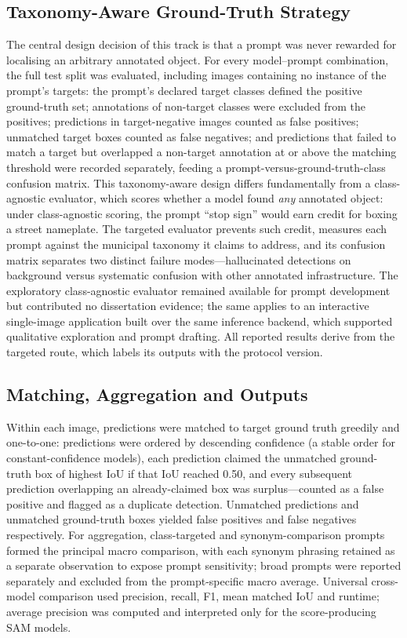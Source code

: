 \subsection{Taxonomy-Aware Ground-Truth Strategy}

The central design decision of this track is that a prompt was never rewarded for localising an arbitrary annotated object. For every model--prompt combination, the full test split was evaluated, including images containing no instance of the prompt's targets: the prompt's declared target classes defined the positive ground-truth set; annotations of non-target classes were excluded from the positives; predictions in target-negative images counted as false positives; unmatched target boxes counted as false negatives; and predictions that failed to match a target but overlapped a non-target annotation at or above the matching threshold were recorded separately, feeding a prompt-versus-ground-truth-class confusion matrix. This taxonomy-aware design differs fundamentally from a class-agnostic evaluator, which scores whether a model found \emph{any} annotated object: under class-agnostic scoring, the prompt ``stop sign'' would earn credit for boxing a street nameplate. The targeted evaluator prevents such credit, measures each prompt against the municipal taxonomy it claims to address, and its confusion matrix separates two distinct failure modes---hallucinated detections on background versus systematic confusion with other annotated infrastructure. The exploratory class-agnostic evaluator remained available for prompt development but contributed no dissertation evidence; the same applies to an interactive single-image application built over the same inference backend, which supported qualitative exploration and prompt drafting. All reported results derive from the targeted route, which labels its outputs with the protocol version.

\subsection{Matching, Aggregation and Outputs}

Within each image, predictions were matched to target ground truth greedily and one-to-one: predictions were ordered by descending confidence (a stable order for constant-confidence models), each prediction claimed the unmatched ground-truth box of highest IoU if that IoU reached 0.50, and every subsequent prediction overlapping an already-claimed box was surplus---counted as a false positive and flagged as a duplicate detection. Unmatched predictions and unmatched ground-truth boxes yielded false positives and false negatives respectively. For aggregation, class-targeted and synonym-comparison prompts formed the principal macro comparison, with each synonym phrasing retained as a separate observation to expose prompt sensitivity; broad prompts were reported separately and excluded from the prompt-specific macro average. Universal cross-model comparison used precision, recall, F1, mean matched IoU and runtime; average precision was computed and interpreted only for the score-producing SAM models.

